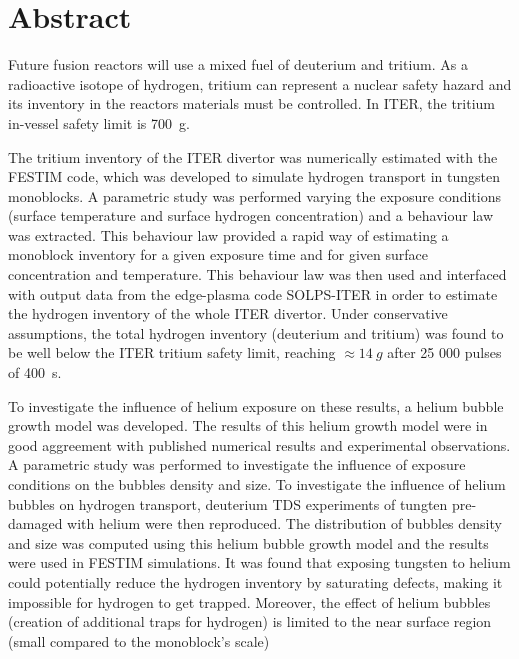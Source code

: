 \chapter*{Abstract}

Future fusion reactors will use a mixed fuel of deuterium and tritium.
As a radioactive isotope of hydrogen, tritium can represent a nuclear safety hazard and its inventory in the reactors materials must be controlled.
In ITER, the tritium in-vessel safety limit is \SI{700}{g}.

The tritium inventory of the ITER divertor was numerically estimated with the FESTIM code, which was developed to simulate hydrogen transport in tungsten monoblocks.
A parametric study was performed varying the exposure conditions (surface temperature and surface hydrogen concentration) and a behaviour law was extracted.
This behaviour law provided a rapid way of estimating a monoblock inventory for a given exposure time and for given surface concentration and temperature.
This behaviour law was then used and interfaced with output data from the edge-plasma code SOLPS-ITER in order to estimate the hydrogen inventory of the whole ITER divertor.
Under conservative assumptions, the total hydrogen inventory (deuterium and tritium) was found to be well below the ITER tritium safety limit, reaching $\approx \SI{14}{g}$ after 25 000 pulses of \SI{400}{s}.

To investigate the influence of helium exposure on these results, a helium bubble growth model was developed.
The results of this helium growth model were in good aggreement with published numerical results and experimental observations.
A parametric study was performed to investigate the influence of exposure conditions on the bubbles density and size.
To investigate the influence of helium bubbles on hydrogen transport, deuterium TDS experiments of tungten pre-damaged with helium were then reproduced.
The distribution of bubbles density and size was computed using this helium bubble growth model and the results were used in FESTIM simulations.
It was found that exposing tungsten to helium could potentially reduce the hydrogen inventory by saturating defects, making it impossible for hydrogen to get trapped.
Moreover, the effect of helium bubbles (creation of additional traps for hydrogen) is limited to the near surface region (small compared to the monoblock's scale)
